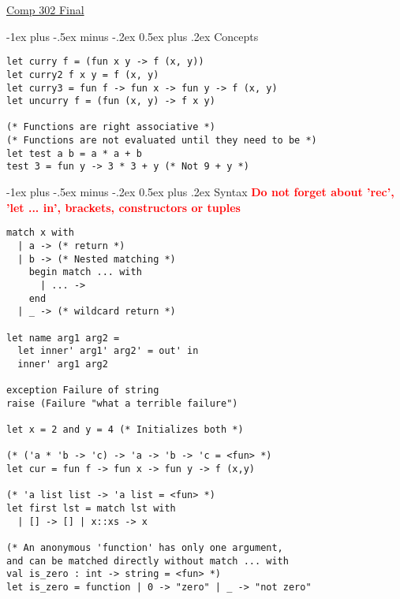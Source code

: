 \documentclass[12pt]{article}
\makeatletter
\renewcommand{\section}{\@startsection{section}{1}{0mm}%
                                    {-1ex plus -.5ex minus -.2ex}%
                                    {0.5ex plus .2ex}%
                                    {\normalfont\large\bfseries\color{header}}}
\makeatother
\begin{document}
\raggedright
\footnotesize
\begin{multicols}{2}


	\setlength{\premulticols}{1pt}
	\setlength{\postmulticols}{1pt}
	\setlength{\multicolsep}{10pt}
	\setlength{\columnsep}{2pt}



	\begin{center}
		\Large{\underline{Comp 302 Final}} \\
	\end{center}

	\section{Concepts}
	\begin{lstlisting}
let curry f = (fun x y -> f (x, y))
let curry2 f x y = f (x, y)
let curry3 = fun f -> fun x -> fun y -> f (x, y)
let uncurry f = (fun (x, y) -> f x y)

(* Functions are right associative *)
(* Functions are not evaluated until they need to be *)
let test a b = a * a + b
test 3 = fun y -> 3 * 3 + y (* Not 9 + y *)
	\end{lstlisting}


    \section{Syntax}
    \textcolor{red}{\textbf{Do not forget about 'rec', 'let ... in', brackets, constructors or tuples}}
	\begin{lstlisting}
match x with
  | a -> (* return *)
  | b -> (* Nested matching *)
    begin match ... with 
      | ... ->
    end
  | _ -> (* wildcard return *)
  
let name arg1 arg2 =
  let inner' arg1' arg2' = out' in
  inner' arg1 arg2
  
exception Failure of string
raise (Failure "what a terrible failure")

let x = 2 and y = 4 (* Initializes both *)

(* ('a * 'b -> 'c) -> 'a -> 'b -> 'c = <fun> *)
let cur = fun f -> fun x -> fun y -> f (x,y)

(* 'a list list -> 'a list = <fun> *)
let first lst = match lst with
  | [] -> [] | x::xs -> x

(* An anonymous 'function' has only one argument,
and can be matched directly without match ... with
val is_zero : int -> string = <fun> *)
let is_zero = function | 0 -> "zero" | _ -> "not zero"


\end{lstlisting}
\end{multicols}
\end{document}

